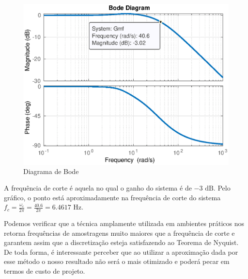         \begin{figure}[!h]
            \centering
            \includegraphics[width = 0.75\linewidth]{Figuras/ProblemaPID/bodeq1c.eps}
            \caption{Diagrama de Bode}
            \label{DB}        
        \end{figure}

        A frequência de corte é aquela no qual o ganho do sistema é de $-3 \text{ dB}$. Pelo gráfico, o ponto está aproximadamente na frequência de corte do sistema 
        $f_c = \frac{\omega_c}{2\pi} = \frac{40.6}{2\pi} = 6.4617 \text{ Hz}$. 
        
        Podemos verificar que a técnica amplamente utilizada em ambientes práticos nos retorna frequências de amostragens muito maiores que a frequência de corte e 
        garantem assim que a discretização esteja satisfazendo ao Teorema de Nyquist. De toda forma, é interessante perceber que ao utilizar a aproximação dada por esse 
        método o nosso resultado não será o mais otimizado e poderá pecar em termos de custo de projeto.